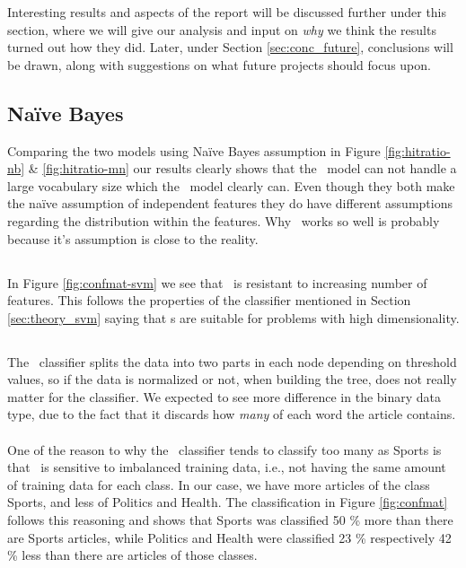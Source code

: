 Interesting results and aspects of the report will be discussed further under this section, where we will give our analysis and input on \emph{why} we think the results turned out how they did. Later, under Section \ref{sec:conc_future}, conclusions will be drawn, along with suggestions on what future projects should focus upon.
\subsection{Naïve Bayes} %
\label{sub:nb}
Comparing the two models using Naïve Bayes assumption in Figure \ref{fig:hitratio-nb} \& \ref{fig:hitratio-mn} our results clearly shows that the \bn\ model can not handle a large vocabulary size which the \mn\ model clearly can. Even though they both make the naïve assumption of independent features they do have different assumptions regarding the distribution within the features. Why \mn\ works so well is probably because it's assumption is close to the reality.

\subsection{\svm}
In Figure \ref{fig:confmat-svm} we see that \svm\ is resistant to increasing number of features. This follows the properties of the classifier mentioned in Section \ref{sec:theory_svm} saying that \svm s are suitable for problems with high dimensionality.

\subsection{\rf}
The \rf\ classifier splits the data into two parts in each node depending on threshold values, so if the data is normalized or not, when building the tree, does not really matter for the classifier. We expected to see more difference in the binary data type, due to the fact that it discards how \emph{many} of each word the article contains.
\\\\
One of the reason to why the \rf\ classifier tends to classify too many as Sports is that \rf\ is sensitive to imbalanced training data, i.e., not having the same amount of training data for each class. In our case, we have more articles of the class Sports, and less of Politics and Health. The classification in Figure \ref{fig:confmat} follows this reasoning and shows that Sports was classified 50 \% more than there are Sports articles, while Politics and Health were classified 23 \% respectively 42 \% less than there are articles of those classes.

